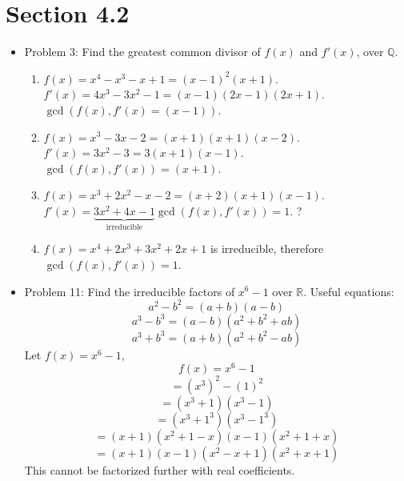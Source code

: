 \documentclass[hidelinks,12pt]{article}
\newcommand{\R}{\mathbb{R}}
\newcommand{\Q}{\mathbb{Q}}
\begin{document}
\section{Section 4.2}
\begin{itemize}
    \item Problem 3: Find the greatest common divisor of $f\left(x\right)$ and $f'\left(x\right)$, over $\Q$.\begin{enumerate}[label=(\alph*)]
        \item $f\left(x\right)=x^4-x^3-x+1=\left(x-1\right)^2\left(x+1\right)$. \newline $f'\left(x\right)=4x^3-3x^2-1=\left(x-1\right)\left(2x-1\right)\left(2x+1\right)$. \newline $\gcd\left(f\left(x\right),f'\left(x\right)=\left(x-1\right)\right)$.
        \item $f\left(x\right)=x^3-3x-2=\left(x+1\right)\left(x+1\right)\left(x-2\right)$.\newline$f'\left(x\right)=3x^2-3=3\left(x+1\right)\left(x-1\right)$.\newline$\gcd\left(f\left(x\right),f'\left(x\right)\right)=\left(x+1\right)$.
        \item $f\left(x\right)=x^3+2x^2-x-2=\left(x+2\right)\left(x+1\right)\left(x-1\right)$.\newline$f'\left(x\right)=\underbrace{3x^2+4x-1}_{\text{irreducible}}$\newline$\gcd\left(f\left(x\right),f'\left(x\right)\right)=1$. ?
        \item $f\left(x\right)=x^4+2x^3+3x^2+2x+1$ is irreducible, therefore $\gcd\left(f\left(x\right),f'\left(x\right)\right)=1$.
    \end{enumerate}
    \item Problem 11: Find the irreducible factors of $x^6-1$ over $\R$. \newline Useful equations:\begin{equation}
        a^2-b^2=\left(a+b\right)\left(a-b\right)
    \end{equation}\begin{equation}
        a^3-b^3=\left(a-b\right)\left(a^2+b^2+ab\right)
    \end{equation}\begin{equation}
        a^3+b^3=\left(a+b\right)\left(a^2+b^2-ab\right)
    \end{equation} Let $f\left(x\right)=x^6-1$, $$f\left(x\right)=x^6-1$$ $$=\left(x^3\right)^2-\left(1\right)^2$$ $$=\left(x^3+1\right)\left(x^3-1\right)$$ $$=\left(x^3+1^3\right)\left(x^3-1^3\right)$$ $$=\left(x+1\right)\left(x^2+1-x\right)\left(x-1\right)\left(x^2+1+x\right)$$ $$=\left(x+1\right)\left(x-1\right)\left(x^2-x+1\right)\left(x^2+x+1\right)$$ This cannot be factorized further with real coefficients.

\end{itemize}
\end{document}
